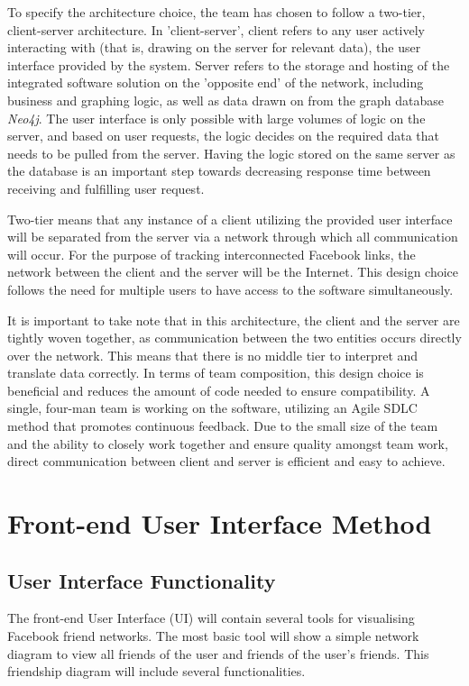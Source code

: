 \documentclass[10pt,onecolumn]{article}
\begin{document}
To specify the architecture choice, the team has chosen to follow a two-tier, client-server architecture. In 'client-server', client refers to any user actively interacting with (that is, drawing on the server for relevant data), the user interface provided by the system. Server refers to the storage and hosting of the integrated software solution on the 'opposite end' of the network, including business and graphing logic, as well as data drawn on from the graph database \emph{Neo4j}. The user interface is only possible with large volumes of logic on the server, and based on user requests, the logic decides on the required data that needs to be pulled from the server. Having the logic stored on the same server as the database is an important step towards decreasing response time between receiving and fulfilling user request. \cite {twotieradvantage}

Two-tier means that any instance of a client utilizing the provided user interface will be separated from the server via a network through which all communication will occur. For the purpose of tracking interconnected Facebook links, the network between the client and the server will be the Internet. This design choice follows the need for multiple users to have access to the software simultaneously. \cite {beginningsofteng}

It is important to take note that in this architecture, the client and the server are tightly woven together, as communication between the two entities occurs directly over the network. This means that there is no middle tier to interpret and translate data correctly. In terms of team composition, this design choice is beneficial and reduces the amount of code needed to ensure compatibility. A single, four-man team is working on the software, utilizing an Agile SDLC method that promotes continuous feedback. Due to the small size of the team and the ability to closely work together and ensure quality amongst team work, direct communication between client and server is efficient and easy to achieve.



\section{Front-end User Interface Method}

\subsection{User Interface Functionality}
The front-end User Interface (UI) will contain several tools for visualising Facebook friend networks. The most basic tool will show a simple network diagram to view all friends of the user and friends of the user's friends. This friendship diagram will include several functionalities.
\end{document}
